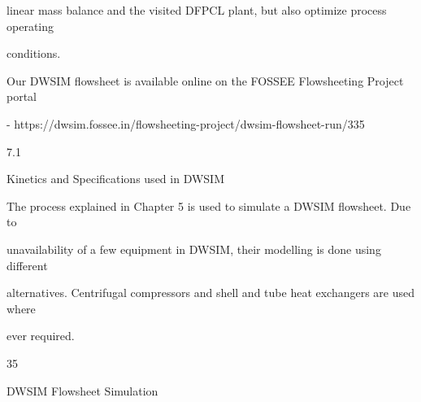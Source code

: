 \documentclass[a4paper,portrait,12pt]{article}
\begin{document}
\begin{flushleft}
linear mass balance and the visited DFPCL plant, but also optimize process operating
\end{flushleft}


\begin{flushleft}
conditions.
\end{flushleft}


\begin{flushleft}
Our DWSIM flowsheet is available online on the FOSSEE Flowsheeting Project portal
\end{flushleft}


\begin{flushleft}
- https://dwsim.fossee.in/flowsheeting-project/dwsim-flowsheet-run/335
\end{flushleft}





7.1





\begin{flushleft}
Kinetics and Specifications used in DWSIM
\end{flushleft}





\begin{flushleft}
The process explained in Chapter 5 is used to simulate a DWSIM flowsheet. Due to
\end{flushleft}


\begin{flushleft}
unavailability of a few equipment in DWSIM, their modelling is done using different
\end{flushleft}


\begin{flushleft}
alternatives. Centrifugal compressors and shell and tube heat exchangers are used where
\end{flushleft}


\begin{flushleft}
ever required.
\end{flushleft}





35





\begin{flushleft}
\newpage
DWSIM Flowsheet Simulation
\end{flushleft}
\end{document}
